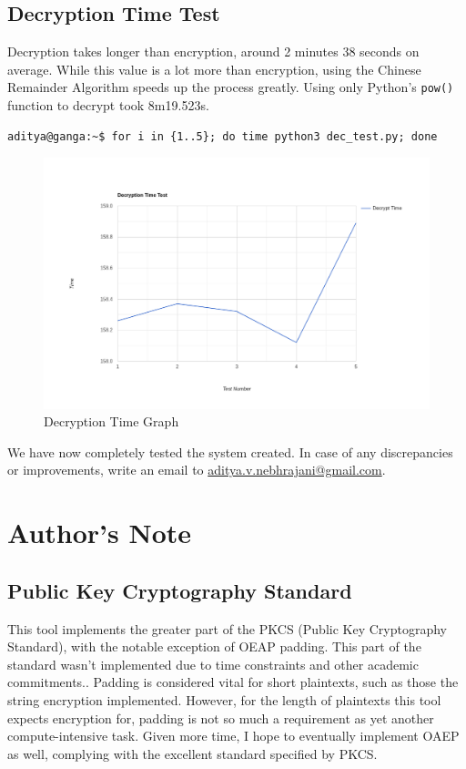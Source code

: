\documentclass{article}
\begin{document}
\subsection{Decryption Time Test}
Decryption takes longer than encryption, around 2 minutes 38 seconds on average. While this value is
a lot more than encryption, using the Chinese Remainder Algorithm speeds up the process greatly.
Using only Python's \texttt{pow()} function to decrypt took 8m19.523s.

\begin{verbatim}
aditya@ganga:~$ for i in {1..5}; do time python3 dec_test.py; done
\end{verbatim}


\begin{figure}[H]
  \centering
  \includegraphics[scale=0.25]{dg.png}
  \caption{Decryption Time Graph}
\end{figure}
We have now completely tested the system created. In case of any discrepancies or improvements,
write an email to \href{mailto: aditya.v.nebhrajani@gmail.com}{aditya.v.nebhrajani@gmail.com}.



\newpage
\section{Author's Note}
\subsection{Public Key Cryptography Standard}
This tool implements the greater part of the PKCS (Public Key Cryptography Standard), with the
notable exception of OEAP padding. This part of the standard wasn't implemented due to time
constraints and other academic commitments.. Padding is considered vital for short plaintexts, such
as those the string encryption implemented. However, for the length of plaintexts this tool
expects encryption for, padding is not so much a requirement as yet another compute-intensive task.
Given more time, I hope to eventually implement OAEP as well, complying with the excellent standard
specified by PKCS.
\end{document}
